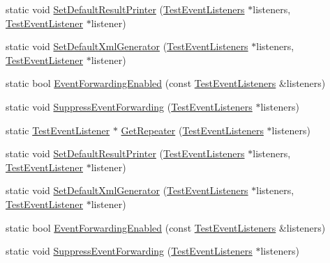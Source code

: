 \begin{DoxyCompactItemize}
\item 
static void \mbox{\hyperlink{classtesting_1_1internal_1_1_test_event_listeners_accessor_ac8886c7cea5a4ad39aed276d3f58da75}{Set\+Default\+Result\+Printer}} (\mbox{\hyperlink{classtesting_1_1_test_event_listeners}{Test\+Event\+Listeners}} $\ast$listeners, \mbox{\hyperlink{classtesting_1_1_test_event_listener}{Test\+Event\+Listener}} $\ast$listener)
\item 
static void \mbox{\hyperlink{classtesting_1_1internal_1_1_test_event_listeners_accessor_a8c04463b5ba5ee6d6da36e2171c7fff0}{Set\+Default\+Xml\+Generator}} (\mbox{\hyperlink{classtesting_1_1_test_event_listeners}{Test\+Event\+Listeners}} $\ast$listeners, \mbox{\hyperlink{classtesting_1_1_test_event_listener}{Test\+Event\+Listener}} $\ast$listener)
\item 
static bool \mbox{\hyperlink{classtesting_1_1internal_1_1_test_event_listeners_accessor_a4a7522557045cb55eb037dc61429d71c}{Event\+Forwarding\+Enabled}} (const \mbox{\hyperlink{classtesting_1_1_test_event_listeners}{Test\+Event\+Listeners}} \&listeners)
\item 
static void \mbox{\hyperlink{classtesting_1_1internal_1_1_test_event_listeners_accessor_abfc0a0f8163465f4f5d42436ec8c7cb3}{Suppress\+Event\+Forwarding}} (\mbox{\hyperlink{classtesting_1_1_test_event_listeners}{Test\+Event\+Listeners}} $\ast$listeners)
\item 
static \mbox{\hyperlink{classtesting_1_1_test_event_listener}{Test\+Event\+Listener}} $\ast$ \mbox{\hyperlink{classtesting_1_1internal_1_1_test_event_listeners_accessor_a07c6f8644e509d0f23c0c16a60856387}{Get\+Repeater}} (\mbox{\hyperlink{classtesting_1_1_test_event_listeners}{Test\+Event\+Listeners}} $\ast$listeners)
\item 
static void \mbox{\hyperlink{classtesting_1_1internal_1_1_test_event_listeners_accessor_ac8886c7cea5a4ad39aed276d3f58da75}{Set\+Default\+Result\+Printer}} (\mbox{\hyperlink{classtesting_1_1_test_event_listeners}{Test\+Event\+Listeners}} $\ast$listeners, \mbox{\hyperlink{classtesting_1_1_test_event_listener}{Test\+Event\+Listener}} $\ast$listener)
\item 
static void \mbox{\hyperlink{classtesting_1_1internal_1_1_test_event_listeners_accessor_a8c04463b5ba5ee6d6da36e2171c7fff0}{Set\+Default\+Xml\+Generator}} (\mbox{\hyperlink{classtesting_1_1_test_event_listeners}{Test\+Event\+Listeners}} $\ast$listeners, \mbox{\hyperlink{classtesting_1_1_test_event_listener}{Test\+Event\+Listener}} $\ast$listener)
\item 
static bool \mbox{\hyperlink{classtesting_1_1internal_1_1_test_event_listeners_accessor_a4a7522557045cb55eb037dc61429d71c}{Event\+Forwarding\+Enabled}} (const \mbox{\hyperlink{classtesting_1_1_test_event_listeners}{Test\+Event\+Listeners}} \&listeners)
\item 
static void \mbox{\hyperlink{classtesting_1_1internal_1_1_test_event_listeners_accessor_abfc0a0f8163465f4f5d42436ec8c7cb3}{Suppress\+Event\+Forwarding}} (\mbox{\hyperlink{classtesting_1_1_test_event_listeners}{Test\+Event\+Listeners}} $\ast$listeners)
\end{DoxyCompactItemize}


